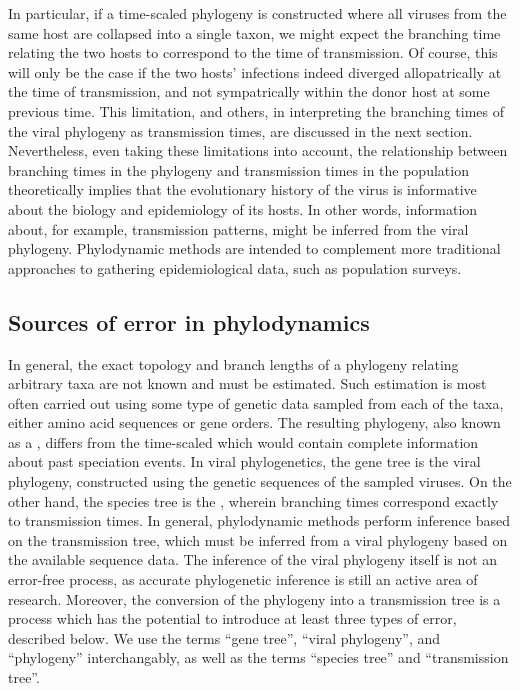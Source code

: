 In particular, if a time-scaled phylogeny is constructed where all viruses from
the same host are collapsed into a single taxon, we might expect the branching
time relating the two hosts to correspond to the time of transmission. Of
course, this will only be the case if the two hosts' infections indeed diverged
allopatrically at the time of transmission, and not sympatrically within the
donor host at some previous time. This limitation, and others, in interpreting
the branching times of the viral phylogeny as transmission times, are discussed
in the next section. Nevertheless, even taking these limitations into account,
the relationship between branching times in the phylogeny and transmission
times in the population theoretically implies that the evolutionary history of
the virus is informative about the biology and epidemiology of its hosts. In
other words, information about, for example, transmission patterns, might be
inferred from the viral phylogeny. Phylodynamic methods are intended to
complement more traditional approaches to gathering epidemiological data, such
as population surveys.

\subsection{Sources of error in phylodynamics}

In general, the exact topology and branch lengths of a phylogeny relating
arbitrary taxa are not known and must be estimated. Such estimation is most
often carried out using some type of genetic data sampled from each of the
taxa, either amino acid sequences or gene orders. The resulting phylogeny, also
known as a , differs from the time-scaled 
which would contain complete information about past speciation events. In
viral phylogenetics, the gene tree is the viral phylogeny, constructed using
the genetic sequences of the sampled viruses. On the other hand, the species
tree is the , wherein branching times correspond
exactly to transmission times. In general, phylodynamic methods perform
inference based on the transmission tree, which must be inferred from a viral
phylogeny based on the available sequence data. The inference of the viral
phylogeny itself is not an error-free process, as accurate phylogenetic
inference is still an active area of research. Moreover, the conversion of the
phylogeny into a transmission tree is a process which has the potential to
introduce at least three types of error, described below. We use the terms
``gene tree'', ``viral phylogeny'', and ``phylogeny'' interchangably, as well
as the terms ``species tree'' and ``transmission tree''.

